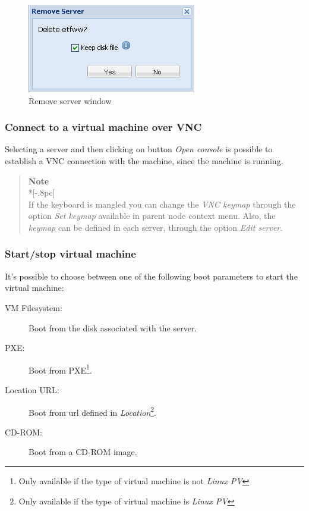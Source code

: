 \begin{figure}[H]
	\begin{center}
	\includegraphics[scale=0.5]{screenshots/server_remove.png}
	\caption{Remove server window}
	\label{fig:server_remove}
	\end{center}
\end{figure}

\subsubsection{Connect to a virtual machine over VNC}
\label{sec:open_vnc}

Selecting a server and then clicking on button \emph{Open console} is possible to establish a VNC connection with the machine, since the machine is running.

\begin{quote}
	{\large \bf Note} \\*[-.8pc]
	\underline{\hspace{6in}} \\
    If the keyboard is mangled you can change the \emph{VNC keymap} through the option \emph{Set keymap} available in parent node context menu.
    Also, the \emph{keymap} can be defined in each server, through the option \emph{Edit server}.
\end{quote}

\subsubsection{Start/stop virtual machine}
\label{sec:start_server}

It's possible to choose between one of the following boot parameters to start the virtual machine:
\begin{description}
    \item[VM Filesystem:] Boot from the disk associated with the server.
    \item[PXE:] Boot from PXE\footnote{Only available if the type of virtual machine is not \emph{Linux PV}\label{foot:notpv}}.
    \item[Location URL:] Boot from url defined in \emph{Location}\footnote{Only available if the type of virtual machine is \emph{Linux PV}}.
	\item[CD-ROM:] Boot from a CD-ROM image.
    	 
\end{description}

